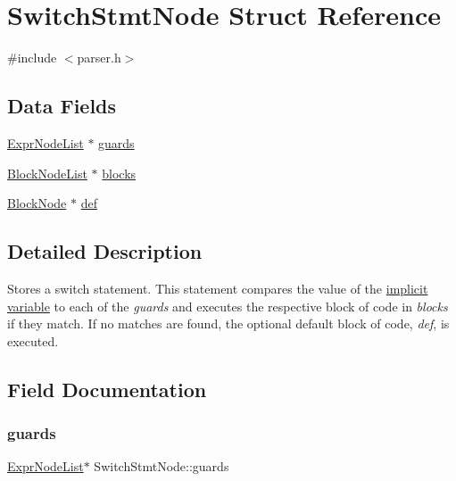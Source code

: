 \hypertarget{struct_switch_stmt_node}{}\section{Switch\+Stmt\+Node Struct Reference}
\label{struct_switch_stmt_node}


{\ttfamily \#include $<$parser.\+h$>$}

\subsection*{Data Fields}
\begin{DoxyCompactItemize}
\item 
\hyperlink{struct_expr_node_list}{Expr\+Node\+List} $\ast$ \hyperlink{struct_switch_stmt_node_a125319a6fd02d72d96d41193daffb4a2}{guards}
\item 
\hyperlink{struct_block_node_list}{Block\+Node\+List} $\ast$ \hyperlink{struct_switch_stmt_node_a6cdb5c66044261b28302b6ca682d7564}{blocks}
\item 
\hyperlink{struct_block_node}{Block\+Node} $\ast$ \hyperlink{struct_switch_stmt_node_ad75de1632a46c451d251959e56d53d44}{def}
\end{DoxyCompactItemize}


\subsection{Detailed Description}
Stores a switch statement. This statement compares the value of the \hyperlink{impvar}{implicit variable} to each of the {\itshape guards} and executes the respective block of code in {\itshape blocks} if they match. If no matches are found, the optional default block of code, {\itshape def}, is executed. 

\subsection{Field Documentation}
\mbox{\label{struct_switch_stmt_node_a125319a6fd02d72d96d41193daffb4a2}} 
\subsubsection{\texorpdfstring{guards}{guards}}
{\footnotesize\ttfamily \hyperlink{struct_expr_node_list}{Expr\+Node\+List}$\ast$ Switch\+Stmt\+Node\+::guards}

